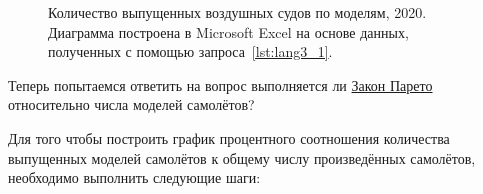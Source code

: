 \begin{figure*}[h]

    \setlength{\fboxsep}{0pt}%
    \setlength{\fboxrule}{1pt}%

	\caption{Количество выпущенных воздушных судов по моделям, 2020. Диаграмма построена в Microsoft Excel на основе данных, полученных с помощью запроса~\ref{lst:lang3_1}.}%
    \label{fig:Number_of_aircraft_produced_ru_2020}%
\end{figure*}


\newpage 
{}
Теперь попытаемся ответить на вопрос выполняется ли \href{https://w.wiki/vDs}{Закон Парето} относительно числа моделей самолётов?

Для того чтобы построить график процентного соотношения количества выпущенных моделей самолётов к общему числу произведённых самолётов, необходимо выполнить следующие шаги:


